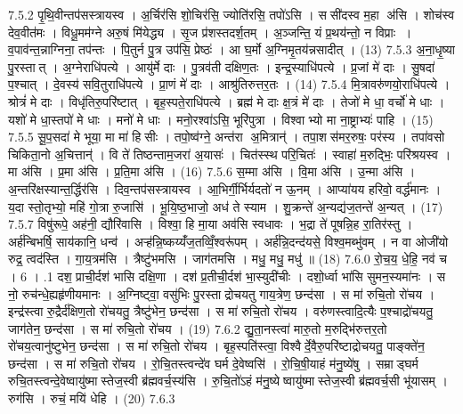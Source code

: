 7.5.2
पृ॒थि॒वीन्तप॑सस्त्रायस्व । अ॒र्चिर॑सि शो॒चिर॑सि॒ ज्योति॑रसि॒ तपो॑ऽसि । ससी॑दस्व म॒हा अ॑सि । शोच॑स्व देव॒वीत॑मः । विधू॒मम॑ग्ने अरु॒षं मि॑येद्ध्य । सृ॒ज प्र॑शस्तदर्\mbox{}श॒तम् । अ॒ञ्जन्ति॒ यं प्र॒थय॑न्तो॒ न विप्राः । व॒पाव॑न्त॒न्नाग्निना॒ तप॑न्तः । पि॒तुर्न पु॒त्र उप॑सि॒ प्रेष्ठः॑ । आ घ॒र्मो अ॒ग्निमृ॒तय॑न्नसादीत् । (13)
7.5.3
अ॒ना॒धृ॒ष्या पु॒रस्तात् । अ॒ग्नेराधि॑पत्ये । आयु॑र्मे दाः । पु॒त्रव॑ती दक्षिण॒तः । इन्द्र॒स्याधि॑पत्ये । प्र॒जां मे॑ दाः । सु॒षदा॑ प॒श्चात् । दे॒वस्य॑ सवि॒तुराधि॑पत्ये । प्रा॒णं मे॑ दाः । आश्रु॑तिरुत्तर॒तः । (14)
7.5.4
मि॒त्रावरु॑णयो॒राधि॑पत्ये । श्रोत्रं॑ मे दाः । विधृ॑तिरु॒परि॑ष्टात् । बृह॒स्पते॒राधि॑पत्ये । ब्रह्म॑ मे दाः क्ष॒त्रं मे॑ दाः । तेजो॑ मे धा॒ वर्चो॑ मे धाः । यशो॑ मे धा॒स्तपो॑ मे धाः । मनो॑ मे धाः । मनो॒रश्वा॑ऽसि॒ भूरि॑पुत्रा । विश्वाभ्यो मा ना॒ष्ट्राभ्यः॑ पाहि । (15)
7.5.5
सू॒प॒सदा॑ मे भूया॒ मा मा॑ हिसीः । तपो॒ष्व॑ग्ने॒ अन्त॑रा अ॒मित्रान्॑ । तपा॒शस॑मर॒रुषः॒ पर॑स्य । तपा॑वसो चिकिता॒नो अ॒चित्तान्॑ । वि ते॑ तिष्ठन्ताम॒जरा॑ अ॒यासः॑ । चित॑स्स्थ परि॒चितः॑ । स्वाहा॑ म॒रुद्भिः॒ परि॑श्रयस्व । मा अ॑सि । प्र॒मा अ॑सि । प्र॒ति॒मा अ॑सि । (16)
7.5.6
स॒म्मा अ॑सि । वि॒मा अ॑सि । उ॒न्मा अ॑सि । अ॒न्तरि॑क्षस्यान्त॒र्द्धिर॑सि । दिव॒न्तप॑सस्त्रायस्व । आ॒भिर्गी॒र्भिर्यदतो॑ न ऊ॒नम् । आप्या॑यय हरिवो॒ वर्द्ध॑मानः । य॒दा स्तो॒तृभ्यो॒ महि॑ गो॒त्रा रु॒जासि॑ । भू॒यि॒ष्ठ॒भाजो॒ अध॑ ते स्याम । शु॒क्रन्ते॑ अ॒न्यद्य॑ज॒तन्ते॑ अ॒न्यत् । (17)
7.5.7
विषु॑रूपे॒ अह॑नी॒ द्यौरि॑वासि । विश्वा॒ हि मा॒या अव॑सि स्वधावः । भ॒द्रा ते॑ पूषन्नि॒ह रा॒तिर॑स्तु । अर्\mbox{}ह॑न्बिभर्\mbox{}षि॒ साय॑कानि॒ धन्व॑ । अऱ्ह॑न्नि॒ष्कय्यँ॑ज॒तव्विँ॒श्वरू॑पम् । अर्\mbox{}ह॑न्नि॒दन्द॑यसे॒ विश्व॒मब्भु॑वम् । न वा ओजी॑यो रुद्र॒ त्वद॑स्ति । गा॒य॒त्रम॑सि । त्रैष्टु॑भमसि । जाग॑तमसि । मधु॒ मधु॒ मधु॑ ॥ (18)
7.6.0
रो॒च॒य॒ धे॒हि॒ नव॑ च । 6 ।
.1
दश॒ प्राची॒र्दश॑ भासि दक्षि॒णा । दश॑ प्र॒तीची॒र्दश॑ भा॒स्युदी॑चीः । दशो॒र्ध्वा भा॑सि सुमन॒स्यमा॑नः । स नो॒ रुच॑न्धे॒ह्यहृ॑णीयमानः । अ॒ग्निष्ट्वा॒ वसु॑भिः पु॒रस्ताद्रोचयतु गाय॒त्रेण॒ छन्द॑सा । स मा॑ रुचि॒तो रो॑चय । इन्द्र॑स्त्वा रु॒द्रैर्द॑क्षिण॒तो रो॑चयतु॒ त्रैष्टु॑भेन॒ छन्द॑सा । स मा॑ रुचि॒तो रो॑चय । वरु॑णस्त्वादि॒त्यैः प॒श्चाद्रो॑चयतु॒ जाग॑तेन॒ छन्द॑सा । स मा॑ रुचि॒तो रो॑चय । (19)
7.6.2
द्यु॒ता॒नस्त्वा॑ मारु॒तो म॒रुद्भि॑रुत्तर॒तो रो॑चय॒त्वानु॑ष्टुभेन॒ छन्द॑सा । स मा॑ रुचि॒तो रो॑चय । बृह॒स्पति॑स्त्वा॒ विश्वैर्दे॒वैरु॒परि॑ष्टाद्रोचयतु॒ पाङ्क्ते॑न॒ छन्द॑सा । स मा॑ रुचि॒तो रो॑चय । रो॒चि॒तस्त्वन्दे॑व घर्म दे॒वेष्वसि॑ । रो॒चि॒षी॒याहं म॑नु॒ष्ये॑षु । सम्राड्घर्म रुचि॒तस्त्वन्दे॒वेष्वायु॑ष्मास्तेज॒स्वी ब्र॑ह्मवर्च॒स्य॑सि । रु॒चि॒तो॑ऽहं म॑नु॒ष्येष्वायु॑ष्मास्तेज॒स्वी ब्र॑ह्मवर्च॒सी भू॑यासम् । रुग॑सि । रुचं॒ मयि॑ धेहि । (20)
7.6.3
